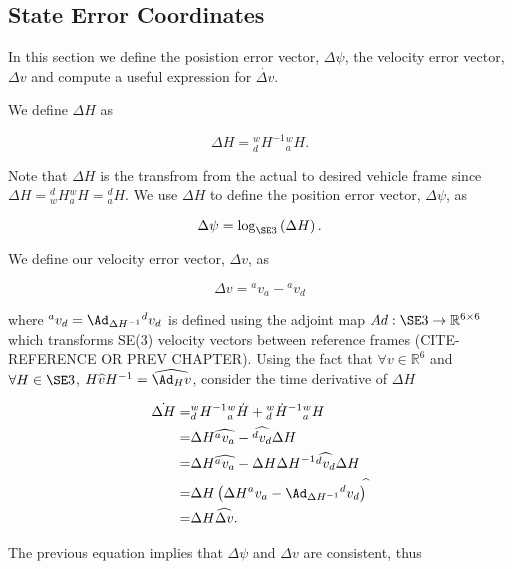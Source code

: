 
\subsection{State Error Coordinates}
\label{chUV_AMTC.sec.SE3_errCoord}

In this section we define the posistion error vector, $\Delta \psi$,
the velocity error vector, $\Delta v$ and compute a useful expression 
for $\dot{\Delta v}$. 


We define $\Delta H$ as 

\begin{equation}
\Delta H={^w_d}H^{-1}{^w_a}H.
\end{equation}

\noindent Note that $\Delta H$ is the transfrom from the actual to desired
vehicle frame since $\Delta H={^d_w}H{^w_a}H={^d_a}H$.  We use $\Delta
H$ to define the position error vector, $\Delta \psi$, as 

\begin{equation}
\Delta \psi=\log_{\SE3}\left(\Delta H \right).
\end{equation}

\noindent We define our velocity error vector, $\Delta v$, as 

\begin{equation}
\Delta v = {^a}v_a-{^a}v_d
\end{equation}
 
\noindent where ${^a}v_d=\Ad_{\Delta H^{-1}}{^d}v_d$ is defined using
the adjoint map $Ad:\SE3\to\mathbb{R}^{6 \times 6}$ which transforms
SE(3) velocity vectors between reference frames (CITE-REFERENCE OR
PREV CHAPTER).  Using the fact that $\forall v\in\mathbb{R}^6$ and 
$\forall H\in\SE3$, $H\widehat{v}H^{-1}=\widehat{\Ad_H v}$, consider 
the time derivative of $\Delta H$  

\begin{align}
\Dot{\Delta H}
  =& {^w_d}H^{-1}{^w_a}\dot{H} + {^w_d}\dot{H}^{-1}{^w_a}H  
\nonumber \\ 
  =&\Delta H \widehat{{^a}v_a} -\widehat{{^d}v_d}\Delta H   
\nonumber \\ 
  =& \Delta H\widehat{{^a}v_a} -\Delta H \Delta H^{-1}\widehat{{^d}v_d}\Delta H 
\nonumber \\ 
  =&\Delta H\left( \Delta H {^a}v_a -\Ad_{\Delta H^{-1}}{^d}v_d\right)^{\widehat{}} 
\nonumber \\ 
  =&\Delta H\widehat{\Delta v}. 
\end{align}

\noindent The previous equation implies that $\Delta \psi$ and $\Delta
v$ are consistent, thus

